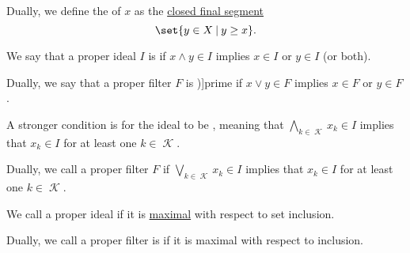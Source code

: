 \begin{definition}
\begin{thmenum}
\begin{paracol}{2}
      \begin{rightcolumn}
        Dually, we define the  of \( x \) as the \hyperref[def:order_interval/unbounded]{closed final segment}
        \begin{equation*}
          \set{ y \in X \given y \geq x }.
        \end{equation*}
      \end{rightcolumn}
    \end{paracol}

    \begin{paracol}{2}
      \begin{leftcolumn}
        We say that a proper ideal \( I \) is  if \( {x \wedge y \in I} \) implies \( {x \in I} \) or \( {y \in I} \) (or both).
      \end{leftcolumn}

      \begin{rightcolumn}
        Dually, we say that a proper filter \( F \) is \term[ru=простой (фильтр) (\cite[183]{Гуров2013Решётки})]{prime} if \( {x \vee y \in F} \) implies \( {x \in F} \) or \( {y \in F} \).
      \end{rightcolumn}
    \end{paracol}

    \begin{paracol}{2}
      \begin{leftcolumn}
        A stronger condition is for the ideal to be , meaning that \( \bigwedge_{k \in \mscrK} x_k \in I \) implies that \( x_k \in I \) for at least one \( k \in \mscrK \).
      \end{leftcolumn}

      \begin{rightcolumn}
        Dually, we call a proper filter \( F \)  if \( \bigvee_{k \in \mscrK} x_k \in I \) implies that \( x_k \in I \) for at least one \( k \in \mscrK \).
      \end{rightcolumn}
    \end{paracol}

    \begin{paracol}{2}
      \begin{leftcolumn}
        We call a proper ideal  if it is \hyperref[def:extremal_points/maximal_and_minimal_element]{maximal} with respect to set inclusion.
      \end{leftcolumn}

      \begin{rightcolumn}
        Dually, we call a proper filter is  if it is maximal with respect to inclusion.
      \end{rightcolumn}
    \end{paracol}
  \end{thmenum}
\end{definition}

